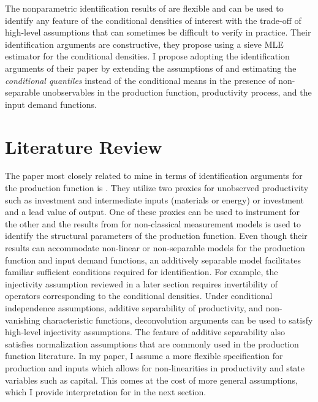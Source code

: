 \documentclass{article}
\begin{document}
The nonparametric identification results of \cite{Hu2008} are flexible and can be used to identify any feature of the conditional densities of interest with the trade-off of high-level assumptions that can sometimes be difficult to verify in practice. Their identification arguments are constructive, they propose using a sieve MLE estimator for the conditional densities. I propose adopting the identification arguments of their paper by extending the assumptions of \cite{Hu2019} and estimating the \textit{conditional quantiles} instead of the conditional means in the presence of non-separable unobservables in the production function, productivity process, and the input demand functions.


\section{Literature Review}

The paper most closely related to mine in terms of identification arguments for the production function is \cite{Hu2019}. They utilize two proxies for unobserved productivity such as investment and intermediate inputs (materials or energy) or investment and a lead value of output. One of these proxies can be used to instrument for the other and the results from \cite{Hu2008} for non-classical measurement models is used to identify the structural parameters of the production function. Even though their results can accommodate non-linear or non-separable models for the production function and input demand functions, an additively separable model facilitates familiar sufficient conditions required for identification. For example, the injectivity assumption reviewed in a later section requires invertibility of operators corresponding to the conditional densities. Under conditional independence assumptions, additive separability of productivity, and non-vanishing characteristic functions, deconvolution arguments can be used to satisfy high-level injectivity assumptions. The feature of additive separability also satisfies normalization assumptions that are commonly used in the production function literature. In my paper, I assume a more flexible specification for production and inputs which allows for non-linearities in productivity and state variables such as capital. This comes at the cost of more general assumptions, which I provide interpretation for in the next section.
\end{document}
